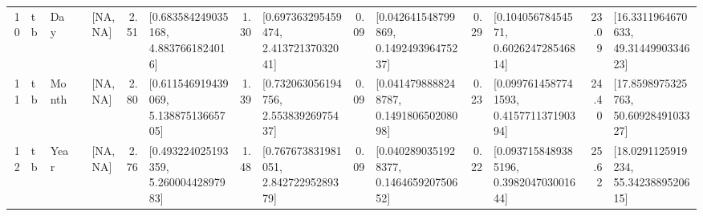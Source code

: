 \begin{table}[ht]
\begin{tabular}{rllrlrlrlrlrlrl}
  10 & tb & Day &  & [NA, NA] & 2.51 & [0.683584249035168, 4.8837661824016] & 1.30 & [0.697363295459474, 2.41372137032041] & 0.09 & [0.042641548799869, 0.149249396475237] & 0.29 & [0.10405678454571, 0.602624728546814] & 23.09 & [16.3311964670633, 49.3144990334623] \\ 
  11 & tb & Month &  & [NA, NA] & 2.80 & [0.611546919439069, 5.13887513665705] & 1.39 & [0.732063056194756, 2.55383926975437] & 0.09 & [0.0414798888248787, 0.149180650208098] & 0.23 & [0.0997614587741593, 0.415771137190394] & 24.40 & [17.8598975325763, 50.6092849103327] \\ 
  12 & tb & Year &  & [NA, NA] & 2.76 & [0.493224025193359, 5.26000442897983] & 1.48 & [0.767673831981051, 2.84272295289379] & 0.09 & [0.0402890351928377, 0.146465920750652] & 0.22 & [0.0937158489385196, 0.398204703001644] & 25.62 & [18.0291125919234, 55.3423889520615] \\ 
   \hline
\end{tabular}
\end{table}

